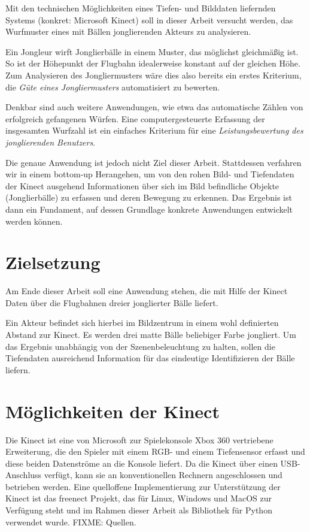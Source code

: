 \documentclass[12pt,a4paper,ngerman]{scrartcl}
\begin{document}
Mit den technischen Möglichkeiten eines Tiefen- und Bilddaten liefernden Systems 
(konkret: Microsoft Kinect) soll in dieser Arbeit versucht werden, das Wurfmuster
eines mit Bällen jonglierenden Akteurs zu analysieren.

Ein Jongleur wirft Jonglierbälle in einem Muster, das möglichst gleichmäßig ist.
So ist der Höhepunkt der Flugbahn idealerweise konstant auf der gleichen Höhe.
Zum Analysieren des Jongliermusters wäre dies also bereits ein erstes Kriterium, 
die \textit{Güte eines Jongliermusters} automatisiert zu bewerten.

Denkbar sind auch weitere Anwendungen, wie etwa das automatische Zählen von 
erfolgreich gefangenen Würfen. Eine computergesteuerte Erfassung der insgesamten
Wurfzahl ist ein einfaches Kriterium für eine \textit{Leistungsbewertung des 
jonglierenden Benutzers}.

Die genaue Anwendung ist jedoch nicht Ziel dieser Arbeit. Stattdessen verfahren wir
in einem bottom-up Herangehen, um von den rohen Bild- und Tiefendaten der Kinect 
ausgehend Informationen über sich im Bild befindliche Objekte (Jonglierbälle) zu
erfassen und deren Bewegung zu erkennen. Das Ergebnis ist dann ein Fundament, auf
dessen Grundlage konkrete Anwendungen entwickelt werden können.

\section{Zielsetzung}

Am Ende dieser Arbeit soll eine Anwendung stehen, die mit Hilfe der Kinect Daten 
über die Flugbahnen dreier jonglierter Bälle liefert. 

Ein Akteur befindet sich hierbei im Bildzentrum in einem wohl definierten Abstand 
zur Kinect. Es werden drei matte Bälle beliebiger Farbe jongliert. Um das Ergebnis
unabhängig von der Szenenbeleuchtung zu halten, sollen die Tiefendaten ausreichend
Information für das eindeutige Identifizieren der Bälle liefern.

\section{Möglichkeiten der Kinect}

Die Kinect ist eine von Microsoft zur Spielekonsole Xbox 360 vertriebene Erweiterung,
die den Spieler mit einem RGB- und einem Tiefensensor erfasst und diese beiden 
Datenströme an die Konsole liefert. Da die Kinect über einen USB-Anschluss verfügt,
kann sie an konventionellen Rechnern angeschlossen und betrieben werden. Eine 
quelloffene Implementierung zur Unterstützung der Kinect ist das freenect Projekt,
das für Linux, Windows und MacOS zur Verfügung steht und im Rahmen dieser Arbeit
als Bibliothek für Python verwendet wurde. FIXME: Quellen.
\end{document}
